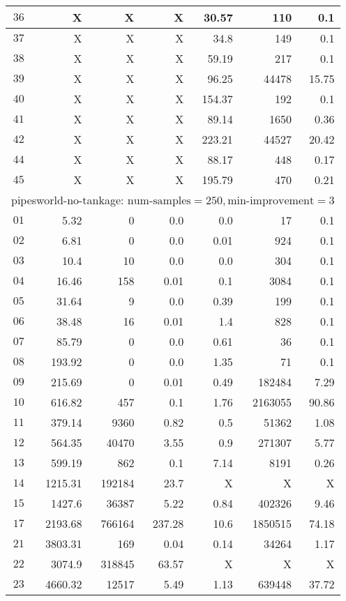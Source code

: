 \begin{longtable}{|c||r|r|r||r|r|r|}
$36$ &  X &  X &  X & 30.57 & 110 & 0.1 \\\hline
$37$ &  X &  X &  X & 34.8 & 149 & 0.1 \\\hline
$38$ &  X &  X &  X & 59.19 & 217 & 0.1 \\\hline
$39$ &  X &  X &  X & 96.25 & 44478 & 15.75 \\\hline
$40$ &  X &  X &  X & 154.37 & 192 & 0.1 \\\hline
$41$ &  X &  X &  X & 89.14 & 1650 & 0.36 \\\hline
$42$ &  X &  X &  X & 223.21 & 44527 & 20.42 \\\hline
$44$ &  X &  X &  X & 88.17 & 448 & 0.17 \\\hline
$45$ &  X &  X &  X & 195.79 & 470 & 0.21 \\\hline

\multicolumn{7}{|l|}{pipesworld-no-tankage: $\text{num-samples}=250,\text{min-improvement}=3$}\\\hline
$01$ & 5.32 & 0 & 0.0 & 0.0 & 17 & 0.1 \\\hline
$02$ & 6.81 & 0 & 0.0 & 0.01 & 924 & 0.1 \\\hline
$03$ & 10.4 & 10 & 0.0 & 0.0 & 304 & 0.1 \\\hline
$04$ & 16.46 & 158 & 0.01 & 0.1 & 3084 & 0.1 \\\hline
$05$ & 31.64 & 9 & 0.0 & 0.39 & 199 & 0.1 \\\hline
$06$ & 38.48 & 16 & 0.01 & 1.4 & 828 & 0.1 \\\hline
$07$ & 85.79 & 0 & 0.0 & 0.61 & 36 & 0.1 \\\hline
$08$ & 193.92 & 0 & 0.0 & 1.35 & 71 & 0.1 \\\hline
$09$ & 215.69 & 0 & 0.01 & 0.49 & 182484 & 7.29 \\\hline
$10$ & 616.82 & 457 & 0.1 & 1.76 & 2163055 & 90.86 \\\hline
$11$ & 379.14 & 9360 & 0.82 & 0.5 & 51362 & 1.08 \\\hline
$12$ & 564.35 & 40470 & 3.55 & 0.9 & 271307 & 5.77 \\\hline
$13$ & 599.19 & 862 & 0.1 & 7.14 & 8191 & 0.26 \\\hline
$14$ & 1215.31 & 192184 & 23.7 & X & X & X \\\hline
$15$ & 1427.6 & 36387 & 5.22 & 0.84 & 402326 & 9.46 \\\hline
$17$ & 2193.68 & 766164 & 237.28 & 10.6 & 1850515 & 74.18 \\\hline
$21$ & 3803.31 & 169 & 0.04 & 0.14 & 34264 & 1.17 \\\hline
$22$ & 3074.9 & 318845 & 63.57 & X & X & X \\\hline
$23$ & 4660.32 & 12517 & 5.49 & 1.13 & 639448 & 37.72 \\\hline


\end{longtable}
